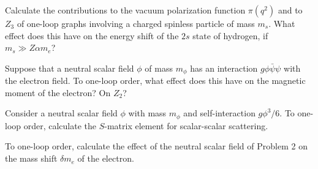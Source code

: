 
\begin{enumerate}
 Calculate the contributions to the vacuum polarization function
$\pi(q^2)$ and to $Z_3$ of one-loop graphs involving a charged spinless
particle of mass $m_s$. What effect does this have on the energy shift of the
$2s$ state of hydrogen, if $m_s \gg Z\alpha m_e$?

 Suppose that a neutral scalar field $\phi$ of mass $m_\phi$ has an
interaction $g\phi\bar\psi\psi$ with the electron field. To one-loop order,
what effect does this have on the magnetic moment of the electron? On $Z_2$?

 Consider a neutral scalar field $\phi$ with mass $m_\phi$ and
self-interaction $g\phi^3/6$. To one-loop order, calculate the $S$-matrix
element for scalar-scalar scattering.

 To one-loop order, calculate the effect of the neutral scalar field of
Problem 2 on the mass shift $\delta m_e$ of the electron.
\end{enumerate}
